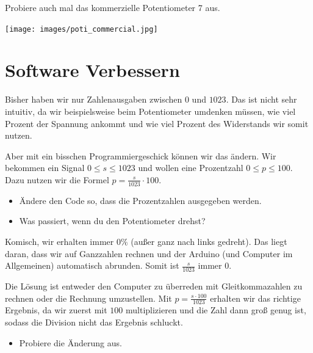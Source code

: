 \documentclass[a4paper,12pt]{book}
\begin{document}
Probiere auch mal das kommerzielle Potentiometer 7 aus.

\begin{center}
  \texttt{[image: images/poti\_commercial.jpg]}
\end{center}

\section*{Software Verbessern}
Bisher haben wir nur Zahlenausgaben zwischen $0$ und $1023$.
Das ist nicht sehr intuitiv, da wir beispielsweise beim Potentiometer umdenken
müssen, wie viel Prozent der Spannung ankommt und wie viel Prozent des Widerstands wir somit nutzen.

Aber mit ein bisschen Programmiergeschick können wir das ändern.
Wir bekommen ein Signal $0\leq s \leq 1023$ und wollen eine Prozentzahl $0\leq p \leq 100$.
Dazu nutzen wir die Formel $p = \frac{s}{1023} \cdot 100$.



\begin{instruction}
  \begin{itemize}
    \item Ändere den Code so, dass die Prozentzahlen ausgegeben werden.
    \item Was passiert, wenn du den Potentiometer drehst?
  \end{itemize}
\end{instruction}

Komisch, wir erhalten immer $0\%$ (außer ganz nach links gedreht).
Das liegt daran, dass wir auf Ganzzahlen rechnen und der Arduino (und Computer im Allgemeinen) automatisch abrunden.
Somit ist $\frac{s}{1023}$ immer $0$.

Die Lösung ist entweder den Computer zu überreden mit Gleitkommazahlen zu rechnen oder die Rechnung umzustellen.
Mit $p = \frac{s \cdot 100}{1023}$ erhalten wir das richtige Ergebnis, da wir zuerst mit $100$ multiplizieren und 
die Zahl dann groß genug ist, sodass die Division nicht das Ergebnis schluckt.

\begin{instruction}
  \begin{itemize}
    \item Probiere die Änderung aus.
  \end{itemize}
\end{instruction}
\end{document}
